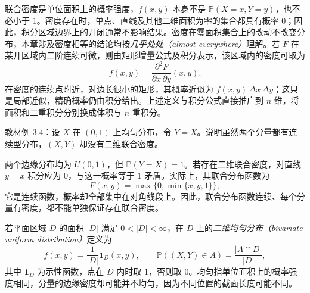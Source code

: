 联合密度是单位面积上的概率强度，$f(x,y)$ 本身不是 $\mathbb P(X=x,Y=y)$，也不必小于 $1$。密度存在时，单点、直线及其他二维面积为零的集合都具有概率 $0$；因此，积分区域边界上的开闭通常不影响结果。密度在零面积集合上的改动不改变分布，本章涉及密度相等的结论均按\emph{几乎处处（almost everywhere）}理解。若 $F$ 在某开区域内二阶连续可微，则由矩形增量公式及积分表示，该区域内的密度可取为
\[
  f(x,y)=\frac{\partial^2F}{\partial x\,\partial y}(x,y).
\]
在密度的连续点附近，对边长很小的矩形，其概率近似为 $f(x,y)\,\Delta x\,\Delta y$；这只是局部近似，精确概率仍由积分给出。上述定义与积分公式直接推广到 $n$ 维，将面积和二重积分分别换成体积与 $n$ 重积分。

\begin{example}
\label{ex:study-ch3-continuous-marginals-singular}
教材例 3.4：设 $X$ 在 $(0,1)$ 上均匀分布，令 $Y=X$。说明虽然两个分量都有连续型分布，$(X,Y)$ 却没有二维联合密度。
\end{example}

\begin{solve}
两个边缘分布均为 $U(0,1)$，但 $\mathbb P(Y=X)=1$。若存在二维联合密度，对直线 $y=x$ 积分应为 $0$，与这一概率等于 $1$ 矛盾。实际上，其联合分布函数为
\[
  F(x,y)=\max\{0,\min\{x,y,1\}\},
\]
它是连续函数，概率却全部集中在对角线段上。因此，联合分布函数连续、每个分量有密度，都不能单独保证存在联合密度。
\end{solve}

若平面区域 $D$ 的面积 $|D|$ 满足 $0<|D|<\infty$，在 $D$ 上的\emph{二维均匀分布（bivariate uniform distribution）}定义为
\begin{equation}
  f(x,y)=\frac1{|D|}\boldsymbol 1_D(x,y),\qquad
  \mathbb P((X,Y)\in A)=\frac{|A\cap D|}{|D|},
  \label{eq:study-ch3-uniform-region}
\end{equation}
其中 $\boldsymbol 1_D$ 为示性函数，点在 $D$ 内时取 $1$，否则取 $0$。均匀指单位面积上的概率强度相同，分量的边缘密度却可能并不均匀，因为不同位置的截面长度可能不同。

